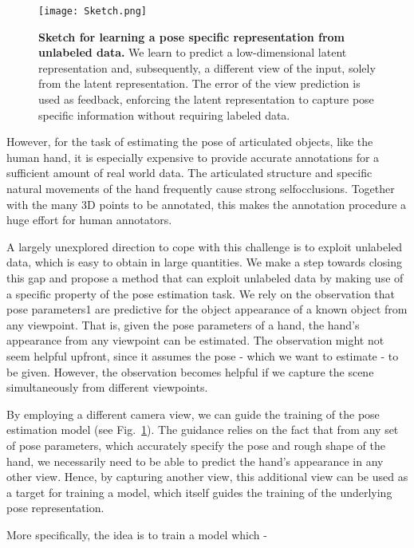 \documentclass[10pt,twocolumn,letterpaper]{article}
\begin{document}
\begin{figure}[H]
\begin{center}
   \texttt{[image: Sketch.png]}
\end{center}
   \caption{\textbf{Sketch for learning a pose specific representation
from unlabeled data.} We learn to predict a low-dimensional latent
representation and, subsequently, a different view of the input,
solely from the latent representation. The error of the view prediction
is used as feedback, enforcing the latent representation to
capture pose specific information without requiring labeled data.}
\label{fig:Sketch}
\end{figure}

However, for the task of estimating the pose of articulated
objects, like the human hand, it is especially expensive
to provide accurate annotations for a sufficient amount
of real world data. The articulated structure and specific
natural movements of the hand frequently cause strong selfocclusions.
Together with the many 3D points to be annotated,
this makes the annotation procedure a huge effort for
human annotators.\par
A largely unexplored direction to cope with this challenge
is to exploit unlabeled data, which is easy to obtain
in large quantities. We make a step towards closing this
gap and propose a method that can exploit unlabeled data
by making use of a specific property of the pose estimation
task. We rely on the observation that pose parameters1
are
predictive for the object appearance of a known object from
any viewpoint. That is, given the pose parameters of a hand,
the hand’s appearance from any viewpoint can be estimated.
The observation might not seem helpful upfront, since it assumes
the pose - which we want to estimate - to be given.
However, the observation becomes helpful if we capture the
scene simultaneously from different viewpoints.\par
By employing a different camera view, we can guide the
training of the pose estimation model (see Fig.~\ref{fig:Sketch}). The guidance
relies on the fact that from any set of pose parameters,
which accurately specify the pose and rough shape of the
hand, we necessarily need to be able to predict the hand’s
appearance in any other view. Hence, by capturing another
view, this additional view can be used as a target for training
a model, which itself guides the training of the underlying
pose representation.\par
More specifically, the idea is to train a model which -
\end{document}
